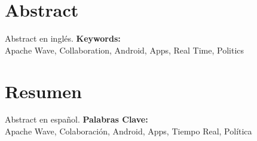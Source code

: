\newpage
\renewcommand{\thepage}{\Roman{page}}
\setcounter{page}{9}
\chapter*{Abstract}
Abstract en inglés.
\vfill
{\large \bf Keywords:}\\
{\large Apache Wave, Collaboration, Android, Apps, Real Time, Politics}

\newpage
\renewcommand{\thepage}{\Roman{page}}
\setcounter{page}{10}
\chapter*{Resumen}
Abstract en español.
\vfill
{\large \bf Palabras Clave:}\\
{\large Apache Wave, Colaboración, Android, Apps, Tiempo Real, Política}

\newpage
\thispagestyle{empty}
\mbox{}

